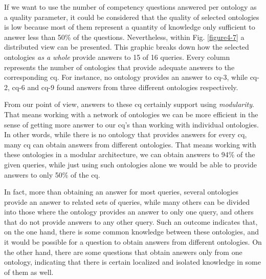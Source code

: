 If we want to use the number of competency questions answered per ontology as a quality parameter, it could be considered that the quality of selected ontologies is low because most of them represent a quantity of knowledge only sufficient to answer less than 50\% of the questions. Nevertheless, within Fig. \ref{figure4-7} a distributed view can be presented. This graphic breaks down how the selected ontologies \textit{as a whole} provide answers to 15 of 16 queries. Every column represents the number of ontologies that provide adequate answers to the corresponding \gls{cq}. For instance, no ontology provides an answer to \gls{cq}-3, while \gls{cq}-2, \gls{cq}-6 and \gls{cq}-9 found answers from three different ontologies respectively. 


From our point of view, answers to these \gls{cq} certainly support using \textit{modularity}. That means working with a network of ontologies we can be more efficient in the sense of getting more answer to our \gls{cq}'s than working with individual ontologies. In other words, while there is no ontology that provides answers for every \gls{cq}, many \gls{cq} can obtain answers from different ontologies. That means working with these ontologies in a modular architecture, we can obtain answers to 94\% of the given queries, while just using such ontologies alone we would be able to provide answers to only 50\% of the \gls{cq}. 

In fact, more than obtaining an answer for most queries, several ontologies provide an answer to related sets of queries, while many others can be divided into those where the ontology provides an answer to only one query, and others that do not provide answers to any other query.  Such an outcome indicates that, on  the one hand, there is some common knowledge between these ontologies, and it would be possible for a question to obtain answers from different ontologies. On the other hand, there are some questions that obtain answers only from one ontology, indicating that there is certain localized and isolated knowledge in some of them as well. 


